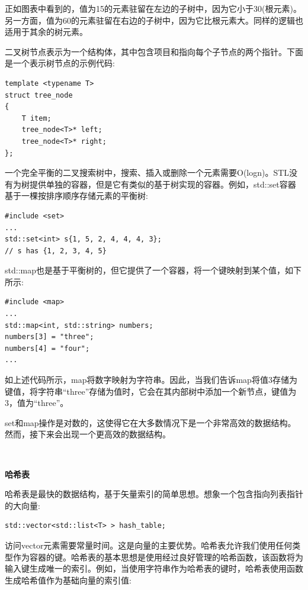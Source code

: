 正如图表中看到的，值为15的元素驻留在左边的子树中，因为它小于30(根元素)。另一方面，值为60的元素驻留在右边的子树中，因为它比根元素大。同样的逻辑也适用于其余的树元素。 \par
二叉树节点表示为一个结构体，其中包含项目和指向每个子节点的两个指针。下面是一个表示树节点的示例代码: \par

\begin{lstlisting}[caption={}]
template <typename T>
struct tree_node
{
	T item;
	tree_node<T>* left;
	tree_node<T>* right;
};
\end{lstlisting}

一个完全平衡的二叉搜索树中，搜索、插入或删除一个元素需要O(logn)。STL没有为树提供单独的容器，但是它有类似的基于树实现的容器。例如，std::set容器基于一棵按排序顺序存储元素的平衡树: \par

\begin{lstlisting}[caption={}]
#include <set>
...
std::set<int> s{1, 5, 2, 4, 4, 4, 3};
// s has {1, 2, 3, 4, 5}
\end{lstlisting}

std::map也是基于平衡树的，但它提供了一个容器，将一个键映射到某个值，如下所示: \par

\begin{lstlisting}[caption={}]
#include <map>
...
std::map<int, std::string> numbers;
numbers[3] = "three";
numbers[4] = "four";
...
\end{lstlisting}

如上述代码所示，map将数字映射为字符串。因此，当我们告诉map将值3存储为键值，将字符串“three”存储为值时，它会在其内部树中添加一个新节点，键值为3，值为“three”。 \par
set和map操作是对数的，这使得它在大多数情况下是一个非常高效的数据结构。然而，接下来会出现一个更高效的数据结构。 \par

\noindent\textbf{}\ \par
\textbf{哈希表} \ \par
哈希表是最快的数据结构，基于矢量索引的简单思想。想象一个包含指向列表指针的大向量: \par

\begin{lstlisting}[caption={}]
std::vector<std::list<T> > hash_table;
\end{lstlisting}

访问vector元素需要常量时间。这是向量的主要优势。哈希表允许我们使用任何类型作为容器的键。哈希表的基本思想是使用经过良好管理的哈希函数，该函数将为输入键生成唯一的索引。例如，当使用字符串作为哈希表的键时，哈希表使用函数生成哈希值作为基础向量的索引值: \par

